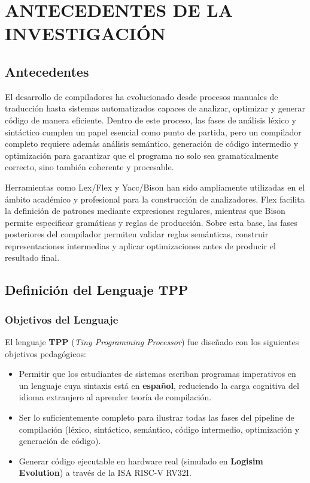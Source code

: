 \chapter{ANTECEDENTES DE LA INVESTIGACIÓN}

\section{Antecedentes}

El desarrollo de compiladores ha evolucionado desde procesos manuales de traducción hasta sistemas automatizados capaces de analizar, optimizar y generar código de manera eficiente. Dentro de este proceso, las fases de análisis léxico y sintáctico cumplen un papel esencial como punto de partida, pero un compilador completo requiere además análisis semántico, generación de código intermedio y optimización para garantizar que el programa no solo sea gramaticalmente correcto, sino también coherente y procesable.

Herramientas como Lex/Flex y Yacc/Bison han sido ampliamente utilizadas en el ámbito académico y profesional para la construcción de analizadores. Flex facilita la definición de patrones mediante expresiones regulares, mientras que Bison permite especificar gramáticas y reglas de producción. Sobre esta base, las fases posteriores del compilador permiten validar reglas semánticas, construir representaciones intermedias y aplicar optimizaciones antes de producir el resultado final.

\section{Definición del Lenguaje TPP}

\subsection{Objetivos del Lenguaje}

El lenguaje \textbf{TPP} (\textit{Tiny Programming Processor}) fue diseñado con los siguientes objetivos pedagógicos:

\begin{itemize}
    \item Permitir que los estudiantes de sistemas escriban programas imperativos en un lenguaje cuya sintaxis está en \textbf{español}, reduciendo la carga cognitiva del idioma extranjero al aprender teoría de compilación.
    \item Ser lo suficientemente completo para ilustrar todas las fases del pipeline de compilación (léxico, sintáctico, semántico, código intermedio, optimización y generación de código).
    \item Generar código ejecutable en hardware real (simulado en \textbf{Logisim Evolution}) a través de la ISA RISC-V RV32I.
\end{itemize}

